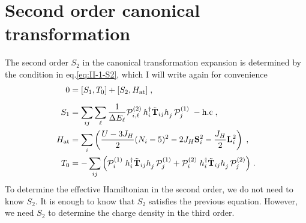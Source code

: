 \section{Second order canonical transformation}
The second order $S_2$ in the canonical transformation expansion is determined by the condition in eq.\eqref{eq:II-1-S2}, which I will write again for convenience
\begin{equation}
    \begin{split}
       0 &= [S_1, T_0]  +
     [S_2, H_{\text{at}}]
     \; , \\[6pt]
     S_1  &= \sum_{ij}\sum_{\ell} \frac{1}{\Delta E_{\ell}} \mathcal{P}^{(2)}_{i,\ell} \, h_i^\dagger  \tilde{\mathbf{T}}_{ij} h_j^{\phantom{\dagger}} \, \mathcal{P}^{(1)}_{j} \;  - \mathrm{h.c}
     \; , \\
     H_{\mathrm{at}} &=\sum_i \left( \frac{U-3J_H}{2}(N_i-5)^2 - 2J_H \mathbf{S}_i^2 - \frac{J_H}{2} \mathbf{L}_i^2 \right)
     \; ,\\
     T_0 &=  - \sum_{ij} \Big( \mathcal{P}_i^{(1)} \;  h_i^\dagger  \tilde{\mathbf{T}}_{ij} h_j^{\phantom{\dagger}}  \, \mathcal{P}_j^{(1)}
     +
     \mathcal{P}_i^{(2)} \;  h_i^\dagger  \tilde{\mathbf{T}}_{ij} h_j^{\phantom{\dagger}}  \, \mathcal{P}_j^{(2)} \Big) \; .
    \end{split}
\end{equation}
To determine the effective Hamiltonian in the second order, we do not need to know $S_2$. It is enough to know that $S_2$ satisfies the previous equation. However, we need $S_2$ to determine the charge density in the third order.

